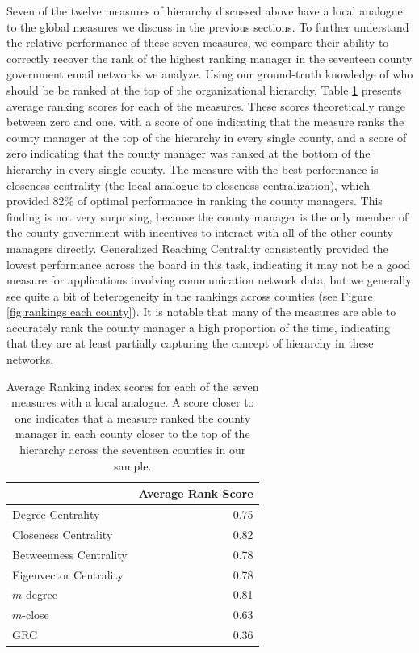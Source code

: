 \documentclass[3p,times]{elsarticle}
\begin{document}
Seven of the twelve measures of hierarchy discussed above have a local analogue to the global measures we discuss in the previous sections.  To further understand the relative performance of these seven measures, we compare their ability to correctly recover the rank of the highest ranking manager in the seventeen county government email networks we analyze. Using our ground-truth knowledge of who should be be ranked at the top of the organizational hierarchy, Table \ref{tab:average local rankings} presents average ranking scores for each of the measures. These scores theoretically range between zero and one, with a score of one indicating that the measure ranks the county manager at the top of the hierarchy in every single county, and a score of zero indicating that the county manager was ranked at the bottom of the hierarchy in every single county. The measure with the best performance is closeness centrality (the local analogue to closeness centralization), which provided 82\% of optimal performance in ranking the county managers. This finding is not very surprising, because the county manager is the only member of the county government with incentives to interact with all of the other county managers directly. Generalized Reaching Centrality consistently provided the lowest performance across the board in this task, indicating it may not be a good measure for applications involving communication network data, but we generally see quite a bit of heterogeneity in the rankings across counties (see Figure \ref{fig:rankings each county}).  It is notable that many of the measures are able to accurately rank the county manager a high proportion of the time, indicating that they are at least partially capturing the concept of hierarchy in these networks. 

\begin{table}[ht]
\centering
\caption{\label{tab:average local rankings} Average Ranking index scores for each of the seven measures with a local analogue. A score closer to one indicates that a measure ranked the county manager in each county closer to the top of the hierarchy across the seventeen counties in our sample.}
\begin{tabular}{lr}
  \toprule
 & Average Rank Score \\ 
  \midrule
Degree Centrality & 0.75 \\ 
  Closeness Centrality & 0.82 \\ 
  Betweenness Centrality & 0.78 \\ 
  Eigenvector Centrality & 0.78 \\ 
  $m$-degree & 0.81 \\ 
  $m$-close & 0.63 \\ 
  GRC & 0.36 \\ 
   \bottomrule
\end{tabular}
\end{table}
\end{document}
